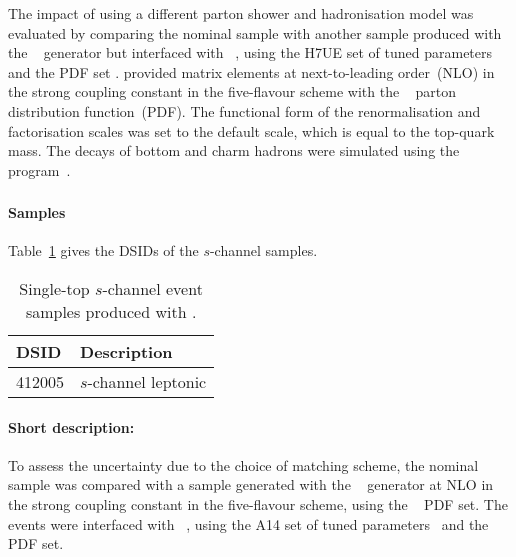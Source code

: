 The impact of using a different parton shower and hadronisation model was evaluated by comparing the nominal sample
with another sample produced with the \POWHEGBOX[v2]~\cite{Alioli:2009je,Nason:2004rx,Frixione:2007vw,Alioli:2010xd}
generator but interfaced with \HERWIG[7.04]~\cite{Bahr:2008pv,Bellm:2015jjp}, using the H7UE set of
tuned parameters~\cite{Bellm:2015jjp} and the \MMHT[lo] PDF set \cite{Harland-Lang:2014zoa}.
\POWHEGBOX provided matrix elements at next-to-leading order~(NLO) in the strong coupling constant \alphas
in the five-flavour scheme with the \NNPDF[3.0nlo]~\cite{Ball:2014uwa} parton distribution function~(PDF).
The functional form of the renormalisation and factorisation scales was set to the default scale, which is equal to the top-quark mass.
The decays of bottom and charm hadrons were simulated using the \EVTGEN[1.6.0] program~\cite{Lange:2001uf}.


\subsubsection[MadGraph5\_aMC@NLO+Pythia8]{\MGNLOPY[8]}
\label{subsubsec:schan_aMCP8}

\paragraph{Samples}

Table~\ref{tab:schan_aMCP8} gives the DSIDs of the $s$-channel \MGNLOPY[8] samples.

\begin{table}[htbp]
  \caption{Single-top $s$-channel event samples produced with \MGNLOPY[8].}%
  \label{tab:schan_aMCP8}
  \centering
  \begin{tabular}{l l}
    \toprule
    DSID & Description \\
    \midrule
    412005 & $s$-channel leptonic \\
    \bottomrule
  \end{tabular}
\end{table}

\paragraph{Short description:}

To assess the uncertainty due to the choice of matching scheme, the nominal sample was compared with a sample generated
with the \MGNLO[2.6.2]~\cite{Alwall:2014hca} generator at NLO in the strong coupling constant \alphas in the five-flavour scheme, 
using the \NNPDF[3.0nlo]~\cite{Ball:2014uwa} PDF set.
The events were interfaced with \PYTHIA[8.230]~\cite{Sjostrand:2014zea}, using the A14 set of tuned parameters~\cite{ATL-PHYS-PUB-2014-021} 
and the \NNPDF[2.3lo] PDF set.



